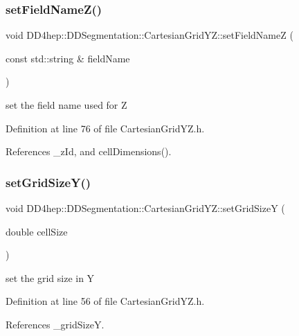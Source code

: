 \subsubsection{\texorpdfstring{set\+Field\+Name\+Z()}{setFieldNameZ()}}
{\footnotesize\ttfamily void D\+D4hep\+::\+D\+D\+Segmentation\+::\+Cartesian\+Grid\+Y\+Z\+::set\+Field\+NameZ (\begin{DoxyParamCaption}\item[{const std\+::string \&}]{field\+Name }\end{DoxyParamCaption})\hspace{0.3cm}{\ttfamily [inline]}}



set the field name used for Z 



Definition at line 76 of file Cartesian\+Grid\+Y\+Z.\+h.



References \+\_\+z\+Id, and cell\+Dimensions().

\hypertarget{class_d_d4hep_1_1_d_d_segmentation_1_1_cartesian_grid_y_z_a0062b881400bc655da7f75720d27af7b}{}\label{class_d_d4hep_1_1_d_d_segmentation_1_1_cartesian_grid_y_z_a0062b881400bc655da7f75720d27af7b} 
\subsubsection{\texorpdfstring{set\+Grid\+Size\+Y()}{setGridSizeY()}}
{\footnotesize\ttfamily void D\+D4hep\+::\+D\+D\+Segmentation\+::\+Cartesian\+Grid\+Y\+Z\+::set\+Grid\+SizeY (\begin{DoxyParamCaption}\item[{double}]{cell\+Size }\end{DoxyParamCaption})\hspace{0.3cm}{\ttfamily [inline]}}



set the grid size in Y 



Definition at line 56 of file Cartesian\+Grid\+Y\+Z.\+h.



References \+\_\+grid\+SizeY.

